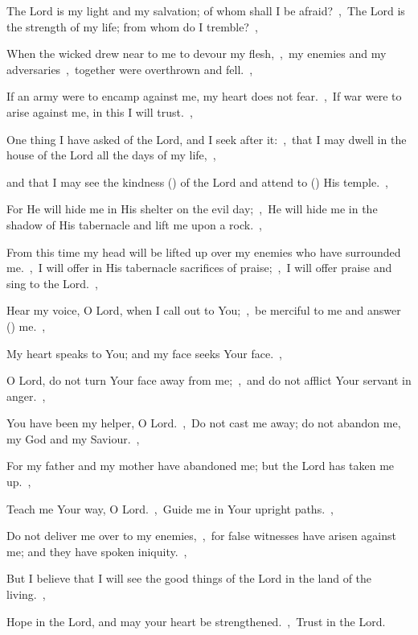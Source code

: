 \documentclass[12pt,twoside,a5paper]{article}
\begin{document}

\begin{normalparskip}
  The Lord is my light and my salvation; of whom shall I be afraid?~\sep\ The Lord is the strength of my life; from whom do I tremble?~\sep


  When the wicked drew near to me to devour my flesh,~\sep\ my enemies and my adversaries~\sep\ together were overthrown and fell.~\sep

  If an army were to encamp against me, my heart does not fear.~\sep\ If war were to arise against me, in this I will trust.~\sep

  One thing I have asked of the Lord, and I seek after it:~\sep\ that I may dwell in the house of the Lord all the days of my life,~\sep

  and that I may see the kindness () of the Lord and attend to () His temple.~\sep

  For He will hide me in His shelter on the evil day;~\sep\ He will hide me in the shadow of His tabernacle and lift me upon a rock.~\sep

  From this time my head will be lifted up over my enemies who have surrounded me.~\sep\ I will offer in His tabernacle sacrifices of praise;~\sep\ I will offer praise and sing to the Lord.~\sep

  Hear my voice, O Lord, when I call out to You;~\sep\ be merciful to me and answer () me.~\sep

  My heart speaks to You; and my face seeks Your face.~\sep

  O Lord, do not turn Your face away from me;~\sep\ and do not afflict Your servant in anger.~\sep

  You have been my helper, O Lord.~\sep\ Do not cast me away; do not abandon me, my God and my Saviour.~\sep

  For my father and my mother have abandoned me; but the Lord has taken me up.~\sep

  Teach me Your way, O Lord.~\sep\ Guide me in Your upright paths.~\sep

  Do not deliver me over to my enemies,~\sep\ for false witnesses have arisen against me; and they have spoken iniquity.~\sep

  But I believe that I will see the good things of the Lord in the land of the living.~\sep

  Hope in the Lord, and may your heart be strengthened.~\sep\ Trust in the Lord.
\end{normalparskip}
\end{document}
